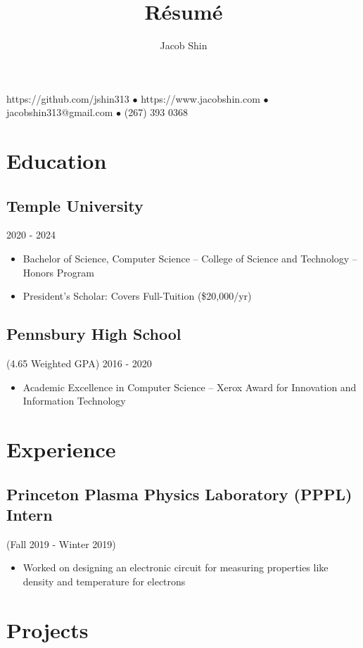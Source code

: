 \documentclass{article}
\makeatletter
\renewcommand{\maketitle}{
    \begin{center}
        {\huge\bfseries
        \theauthor}
    \end{center}
    \begin{center}
        \vspace{1em}
        \leavevmode
        https://github.com/jshin313 $\bullet$ https://www.jacobshin.com $\bullet$ jacobshin313@gmail.com $\bullet$ (267) 393 0368
    \end{center}
}
\makeatother
\begin{document}
\title{R\'esum\'e}
\author{Jacob Shin}

\maketitle
\section{Education}
\subsection{Temple University}\hspace{31em} 2020 - 2024
\begin{itemize}
    \item Bachelor of Science, Computer Science -- College of Science and Technology -- Honors Program
    \item President's Scholar: Covers Full-Tuition (\$20,000/yr)
\end{itemize}

\subsection{Pennsbury High School}(4.65 Weighted GPA)\hspace{19em} 2016 - 2020
\begin{itemize}
    \item Academic Excellence in Computer Science -- Xerox Award for Innovation and Information Technology
\end{itemize}

\section{Experience}
\subsection{Princeton Plasma Physics Laboratory (PPPL) Intern} (Fall 2019 - Winter 2019)
\begin{itemize}
    \item Worked on designing an electronic circuit for measuring properties like density and temperature for electrons
\end{itemize}

\section{Projects}
\end{document}
